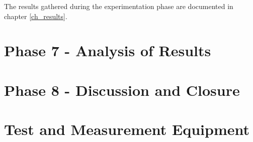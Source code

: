 The results gathered during the experimentation phase are documented in chapter \ref{ch_results}.


\section{Phase 7 - Analysis of Results}




\section{Phase 8 - Discussion and Closure}





\section{Test and Measurement Equipment}
\label{sec:test_and_measurement_equipment}








